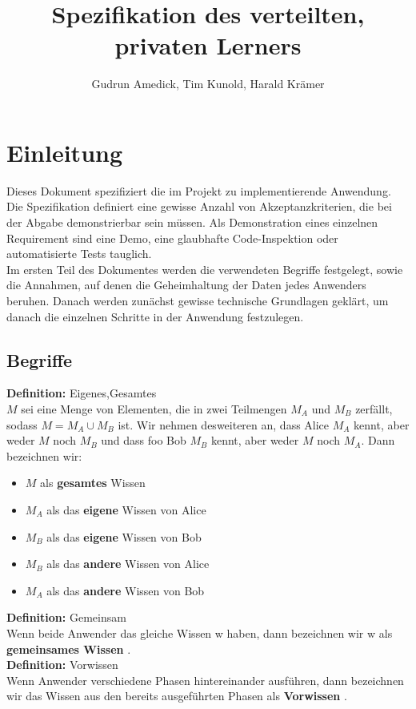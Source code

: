 \documentclass{article}
\author{Gudrun Amedick, Tim Kunold, Harald Kr\"amer}
\title{Spezifikation des verteilten, privaten Lerners}
\date{}
\newenvironment{definition}
    [1]
    {
        {\bf Definition:} #1\\
    }
    {}
\newcommand{\defined}
    [1]
    {
        {\bf #1}
    }
\begin{document}
\maketitle
\pagebreak
\tableofcontents
\pagebreak
\section{Einleitung}
Dieses Dokument spezifiziert die im Projekt zu implementierende Anwendung.
Die Spezifikation definiert eine gewisse Anzahl von Akzeptanzkriterien,
die bei der Abgabe demonstrierbar sein m\"ussen. Als Demonstration 
eines einzelnen Requirement sind
eine Demo, eine glaubhafte Code-Inspektion oder automatisierte Tests tauglich.\\
Im ersten Teil des Dokumentes werden die verwendeten Begriffe festgelegt,
sowie die Annahmen, auf denen die Geheimhaltung der Daten jedes Anwenders beruhen.
Danach werden zun\"achst gewisse technische Grundlagen gekl\"art, um danach
die einzelnen Schritte in der Anwendung festzulegen.

\subsection{Begriffe}
\begin{definition}{Eigenes,Gesamtes}
\(M\) sei eine Menge von Elementen, die in zwei Teilmengen \(M_A\)
und \(M_B\) zerf\"allt, sodass \(M = M_A \cup M_B\) ist. Wir nehmen
desweiteren an, dass Alice \(M_A\) kennt, aber weder \(M\) noch \(M_B\)
und dass foo Bob \(M_B\) kennt, aber weder \(M\) noch \(M_A\). Dann bezeichnen
wir:
\begin{itemize}
\item \(M\) als \defined{gesamtes} Wissen
\item \(M_A\) als das \defined{eigene} Wissen von Alice
\item \(M_B\) als das \defined{eigene} Wissen von Bob
\item \(M_B\) als das \defined{andere} Wissen von Alice
\item \(M_A\) als das \defined{andere} Wissen von Bob
\end{itemize}
\end{definition}
\begin{definition}{Gemeinsam}
Wenn beide Anwender das gleiche Wissen w haben, dann bezeichnen wir w
als \defined{gemeinsames Wissen}. 
\end{definition}\\
\begin{definition}{Vorwissen}
Wenn Anwender verschiedene Phasen hintereinander ausf\"uhren, dann bezeichnen
wir das Wissen aus den bereits ausgef\"uhrten Phasen als \defined{Vorwissen}.
\end{definition}\\
\end{document}
